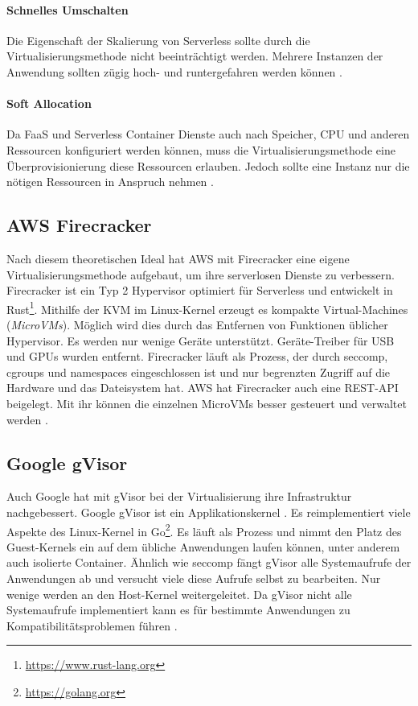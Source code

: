 \paragraph{Schnelles Umschalten} Die Eigenschaft der Skalierung von
Serverless sollte durch die Virtualisierungsmethode nicht
beeinträchtigt werden. Mehrere Instanzen der Anwendung sollten
zügig hoch- und runtergefahren werden können \cite{Firecracker}.

\paragraph{Soft Allocation} Da FaaS und Serverless
Container Dienste auch nach Speicher,
CPU und anderen Ressourcen konfiguriert
werden können, muss die Virtualisierungsmethode eine
Überprovisionierung diese Ressourcen erlauben. Jedoch sollte
eine Instanz nur die nötigen Ressourcen in Anspruch nehmen
\cite{Firecracker}.

\subsection{AWS Firecracker}
Nach diesem theoretischen Ideal hat AWS mit Firecracker \cite{Firecracker}
eine eigene Virtualisierungsmethode aufgebaut, um ihre
serverlosen Dienste zu verbessern.
Firecracker ist ein Typ 2 Hypervisor optimiert für Serverless
und entwickelt in Rust\footnote{\url{https://www.rust-lang.org}}.
Mithilfe der KVM im Linux-Kernel erzeugt es kompakte
Virtual-Machines (\emph{MicroVMs}). Möglich wird dies durch das
Entfernen von Funktionen üblicher Hypervisor. Es werden nur wenige
Geräte unterstützt. Geräte-Treiber für USB und
GPUs wurden entfernt. Firecracker läuft als Prozess, der durch seccomp,
cgroups und namespaces
eingeschlossen ist und nur begrenzten Zugriff auf die
Hardware und das Dateisystem hat. 
AWS hat Firecracker
auch eine REST-API beigelegt. Mit ihr können die einzelnen
MicroVMs besser gesteuert und verwaltet werden \cite{Firecracker}. 

\subsection{Google gVisor}
Auch Google hat mit gVisor bei der Virtualisierung
ihre Infrastruktur nachgebessert. Google gVisor ist ein
Applikationskernel \cite{gVisor}. Es reimplementiert viele
Aspekte des Linux-Kernel in Go\footnote{\url{https://golang.org}}.
Es läuft als Prozess und nimmt den Platz des Guest-Kernels ein
auf dem übliche Anwendungen laufen können, unter anderem auch
isolierte Container.
Ähnlich wie seccomp fängt gVisor alle Systemaufrufe der
Anwendungen ab und versucht viele diese Aufrufe selbst zu bearbeiten.
Nur wenige werden an den Host-Kernel weitergeleitet. Da gVisor
nicht alle Systemaufrufe implementiert kann es für bestimmte Anwendungen zu Kompatibilitätsproblemen
führen \cite{gVisor}.